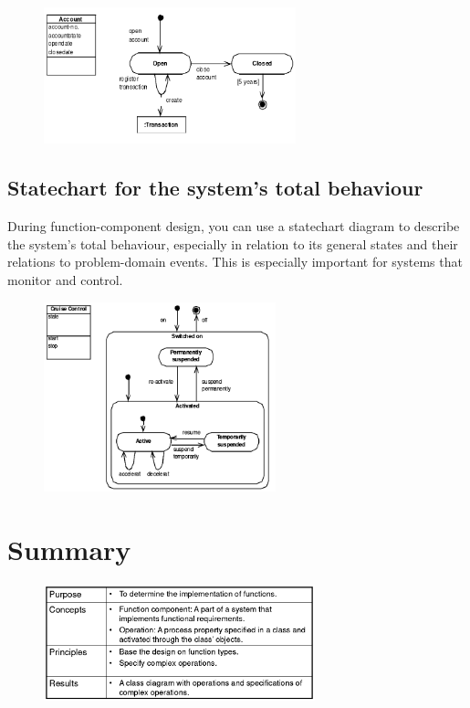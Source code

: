 \begin{figure}[H]
    \centering
    \includegraphics[width=0.65\textwidth]{figures/statechartforclass.png}
\end{figure}

\subsection{Statechart for the system's total behaviour}
During function-component design, you can use a statechart diagram to describe the system's total behaviour, especially in relation to its general states and their relations to problem-domain events. This is especially important for systems that monitor and control.

\begin{figure}[H]
    \centering
    \includegraphics[width=0.6\textwidth]{figures/statechartforsystembehaviour.png}
\end{figure}

\section{Summary}

\begin{figure}[H]
    \centering
    \includegraphics[width=0.7\textwidth]{figures/functioncomponentsummary.png}
\end{figure}

